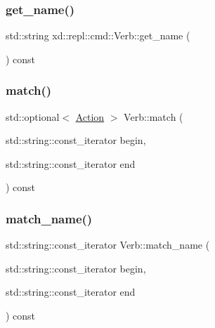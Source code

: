 \mbox{\label{classxd_1_1repl_1_1cmd_1_1_verb_a7b06a5c832eb6d0c61fa90da7631d7e8}} 
\subsubsection{\texorpdfstring{get\+\_\+name()}{get\_name()}}
{\footnotesize\ttfamily std\+::string xd\+::repl\+::cmd\+::\+Verb\+::get\+\_\+name (\begin{DoxyParamCaption}{ }\end{DoxyParamCaption}) const\hspace{0.3cm}{\ttfamily [inline]}}

\mbox{\label{classxd_1_1repl_1_1cmd_1_1_verb_ac8f69a959ffea14e0056928c55ebde26}} 
\subsubsection{\texorpdfstring{match()}{match()}}
{\footnotesize\ttfamily std\+::optional$<$ \mbox{\hyperlink{namespacexd_1_1repl_1_1cmd_a7274841bd02a9c5da0ba48ae204ab3d5}{Action}} $>$ Verb\+::match (\begin{DoxyParamCaption}\item[{std\+::string\+::const\+\_\+iterator}]{begin,  }\item[{std\+::string\+::const\+\_\+iterator}]{end }\end{DoxyParamCaption}) const}

\mbox{\label{classxd_1_1repl_1_1cmd_1_1_verb_a5719b32998c5b7a19b36183bd1235e54}} 
\subsubsection{\texorpdfstring{match\+\_\+name()}{match\_name()}}
{\footnotesize\ttfamily std\+::string\+::const\+\_\+iterator Verb\+::match\+\_\+name (\begin{DoxyParamCaption}\item[{std\+::string\+::const\+\_\+iterator}]{begin,  }\item[{std\+::string\+::const\+\_\+iterator}]{end }\end{DoxyParamCaption}) const}

